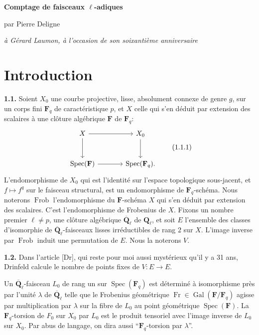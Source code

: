 \documentclass[11pt]{article}
\newcommand{\Fq}{\mathbf{F}_q}
\newcommand{\F}{\mathbf{F}}
\newcommand{\Qbl}{\overline{\mathbf{Q}}_{\ell}}
\newcommand{\Ql}{\mathbf{Q}_{\ell}}
\newcommand{\Spec}{\operatorname{Spec}}
\newcommand{\Gal}{\operatorname{Gal}}
\newcommand{\Frob}{\operatorname{Frob}}
\newcommand{\Fr}{\operatorname{Fr}}
\newcommand{\para}[1]{\medskip\noindent\textbf{#1}\enspace}
\begin{document}
\begin{center}
{\Large\bfseries Comptage de faisceaux \(\ell\)-adiques}\par
\vspace{0.35em}
{par Pierre Deligne}\par
\vspace{0.6em}
{\itshape à Gérard Laumon, à l'occasion de son soixantième anniversaire}
\end{center}

\section{Introduction}

\para{1.1.} Soient \(X_0\) une courbe projective, lisse, absolument connexe de genre \(g\), sur un corps fini \(\Fq\) de caractéristique \(p\), et \(X\) celle qui s'en déduit par extension des scalaires à une clôture algébrique \(\F\) de \(\Fq\):
\begin{equation}
\begin{tikzcd}[ampersand replacement=\&,column sep=large,row sep=large]
X \arrow[r] \arrow[d] \& X_0 \arrow[d] \\
\Spec(\F) \arrow[r] \& \Spec(\Fq).
\end{tikzcd}
\tag{1.1.1}
\end{equation}
L'endomorphisme de \(X_0\) qui est l'identité sur l'espace topologique sous-jacent, et \(f\mapsto f^q\) sur le faisceau structural, est un endomorphisme de \(\Fq\)-schéma. Nous noterons \(\Frob\) l'endomorphisme du \(\F\)-schéma \(X\) qui s'en déduit par extension des scalaires. C'est l'endomorphisme de Frobenius de \(X\). Fixons un nombre premier \(\ell\ne p\), une clôture algébrique \(\Qbl\) de \(\Ql\), et soit \(E\) l'ensemble des classes d'isomorphie de \(\Qbl\)-faisceaux lisses irréductibles de rang \(2\) sur \(X\). L'image inverse par \(\Frob\) induit une permutation de \(E\). Nous la noterons \(V\).

\para{1.2.} Dans l'article [Dr], qui reste pour moi aussi mystérieux qu'il y a 31 ans, Drinfeld calcule le nombre de points fixes de \(V:E\to E\).

Un \(\Qbl\)-faisceau \(L_0\) de rang un sur \(\Spec(\Fq)\) est déterminé à isomorphisme près par l'unité \(\lambda\) de \(\Qbl\) telle que le Frobenius géométrique \(\Fr\in\Gal(\F/\Fq)\) agisse par multiplication par \(\lambda\) sur la fibre de \(L_0\) au point géométrique \(\Spec(\F)\). La \(\Fq\)-torsion de \(F_0\) sur \(X_0\) par \(L_0\) est le produit tensoriel avec l'image inverse de \(L_0\) sur \(X_0\). Par abus de langage, on dira aussi ``\(\Fq\)-torsion par \(\lambda\)''.
\end{document}
